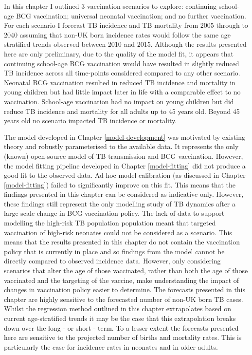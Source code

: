 \documentclass[11pt,twoside]{bristolthesis}
\begin{document}
  In this chapter I outlined 3 vaccination scenarios to explore: continuing school-age BCG vaccination; universal neonatal vaccination; and no further vaccination. For each scenario I forecast TB incidence and TB mortality from 2005 through to 2040 assuming that non-UK born incidence rates would follow the same age stratified trends observed between 2010 and 2015. Although the results presented here are only preliminary, due to the quality of the model fit, it appears that continuing school-age BCG vaccination would have resulted in slightly reduced TB incidence across all time-points considered compared to any other scenario. Neonatal BCG vaccination resulted in reduced TB incidence and mortality in young children but had little impact later in life with a comparable effect to no vaccination. School-age vaccination had no impact on young children but did reduce TB incidence and mortality for all adults up to 45 years old. Beyond 45 years old no scenario impacted TB incidence or mortality.
  
  The model developed in Chapter \ref{model-development} was motivated by existing theory and robustly parameterised to the available data. It represents the only (known) open-source model of TB transmission and BCG vaccination. However, the model fitting pipeline developed in Chapter \ref{model-fitting} did not produce a good fit to the observed data. Ad-hoc model calibration (as discussed in Chapter \ref{model-fitting}) failed to significantly improve on this fit. This means that the findings presented in this chapter can be considered as indicative only. However, these findings still represent the only modelling study of TB dynamics after a large scale change in BCG vaccination policy. The lack of data to support modelling the high-risk TB population population meant that targeted vaccination of high-risk neonates could not be considered as a scenario. This means that the results presented in this chapter do not contain the vaccination policy that is currently in place and so findings from the model cannot be directly compared to observed incidence data. However, only considering scenarios that alter the age of those vaccinated, rather than both the age of those vaccinated and the targeting of the vaccine, make understanding the impact of changes in vaccination policy easier to determine. The forecasts presented in this chapter are highly sensitive to the forecasted number of non-UK born TB cases. Whilst the regression method outlined in this chapter extrapolates based on current age-stratified trends it may be the case that this extrapolation breaks down over the long - or short - term. To a lesser extent the forecasts presented here are sensitive to the projected number of births and mortality rates. This is particularly the case for incidence rates in neonates and in older adults.
  
\end{document}
